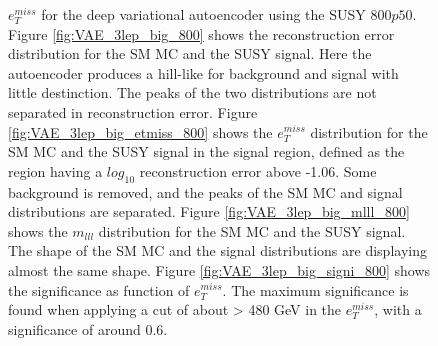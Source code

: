 \begin{figure}[!htb]
{    $e_T^{miss}$ for the deep variational autoencoder using the SUSY $800p50$.
    Figure \ref{fig:VAE_3lep_big_800} shows the reconstruction error 
    distribution for the SM MC and the SUSY signal. Here the autoencoder produces a hill-like for background and 
    signal with little destinction. The peaks of the two distributions are not separated in reconstruction error. Figure \ref{fig:VAE_3lep_big_etmiss_800} 
    shows the $e_T^{miss}$ distribution for the SM MC and the SUSY signal in the signal region, defined as the region having a $log_{10}$ 
    reconstruction error above -1.06. Some background is removed, and the peaks of the SM MC and signal 
    distributions are separated. Figure \ref{fig:VAE_3lep_big_mlll_800} shows the $m_{lll}$ distribution for the SM MC and the SUSY signal. 
    The shape of the SM MC and the signal distributions are displaying almost the same shape. Figure \ref{fig:VAE_3lep_big_signi_800} shows the significance as 
    function of $e_T^{miss}$. The maximum significance is found when applying a cut of about > 480 GeV in the $e_T^{miss}$, with a significance of around $0.6$.}
    \label{fig:VAE_3lep_big_rec_sig_signi_800}
\end{figure}

